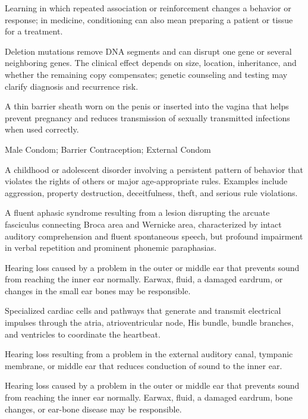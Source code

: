  Learning in which repeated association or reinforcement changes a behavior or response; in medicine, conditioning can also mean preparing a patient or tissue for a treatment.

 Deletion mutations remove DNA segments and can disrupt one gene or several neighboring genes. The clinical effect depends on size, location, inheritance, and whether the remaining copy compensates; genetic counseling and testing may clarify diagnosis and recurrence risk.

 A thin barrier sheath worn on the penis or inserted into the vagina that helps prevent pregnancy and reduces transmission of sexually transmitted infections when used correctly.

\synonyms
Male Condom; Barrier Contraception; External Condom

 A childhood or adolescent disorder involving a persistent pattern of behavior that violates
the rights of others or major age-appropriate rules. Examples include aggression,
property destruction, deceitfulness, theft, and serious rule violations.

 A fluent aphasic syndrome resulting from a lesion disrupting the arcuate fasciculus connecting Broca area and Wernicke area, characterized by intact auditory comprehension and fluent spontaneous speech, but profound impairment in verbal repetition and prominent phonemic paraphasias.

 Hearing loss caused by a problem in the outer or middle ear that prevents sound from reaching the inner ear normally. Earwax, fluid, a damaged eardrum, or changes in the small ear bones may be responsible.

 Specialized cardiac cells and pathways that generate and
transmit electrical impulses through the atria, atrioventricular node, His bundle, bundle
branches, and ventricles to coordinate the heartbeat.

 Hearing loss resulting from a problem in the external auditory canal, tympanic membrane,
or middle ear that reduces conduction of sound to the inner ear.

 Hearing loss caused by a problem in the outer or middle ear that prevents sound from reaching the inner ear normally. Earwax, fluid, a damaged eardrum, bone changes, or ear-bone disease may be responsible.

